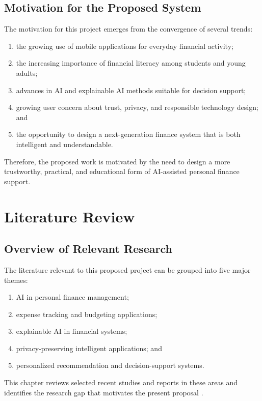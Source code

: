 \documentclass[12pt,a4paper]{report}
\begin{document}
\section{Motivation for the Proposed System}
The motivation for this project emerges from the convergence of several trends:
\begin{enumerate}[label=\arabic*.]
\item the growing use of mobile applications for everyday financial activity;
\item the increasing importance of financial literacy among students and young adults;
\item advances in AI and explainable AI methods suitable for decision support;
\item growing user concern about trust,
privacy,
and responsible technology design; and
\item the opportunity to design a next-generation finance system that is both intelligent and understandable.
\end{enumerate}

Therefore,
the proposed work is motivated by the need to design a more trustworthy,
practical,
and educational form of AI-assisted personal finance support.

\chapter{Literature Review}

\section{Overview of Relevant Research}
The literature relevant to this proposed project can be grouped into five major themes:
\begin{enumerate}[label=\arabic*.]
\item AI in personal finance management;
\item expense tracking and budgeting applications;
\item explainable AI in financial systems;
\item privacy-preserving intelligent applications;
and
\item personalized recommendation and decision-support systems.
\end{enumerate}

This chapter reviews selected recent studies and reports in these areas and identifies the research gap that motivates the present proposal \cite{ref6,ref7,ref8,ref10,ref12}.
\end{document}
